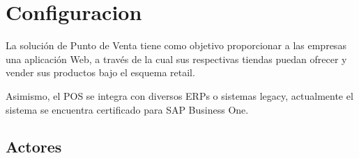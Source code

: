 \documentclass[pdftex,12pt,oneside,a4paper,spanish, english, brazil]{abntex2}
\begin{document}
      \begin{sloppypar}
          
            
            \frenchspacing
          
          \pretextual

            
            \cleardoublepage
          



            \vspace{1cm}
           
          \textual
          
          
            \chapter{Configuracion}
            La solución de Punto de Venta tiene como objetivo proporcionar a las empresas una aplicación Web, a través de la cual sus respectivas tiendas puedan ofrecer y vender sus productos bajo el esquema retail.
            
            Asimismo, el POS se integra con diversos ERPs o sistemas legacy, actualmente el sistema se encuentra certificado para SAP Business One.
            
            
            \section{Actores}
            

\end{sloppypar}
\end{document}
